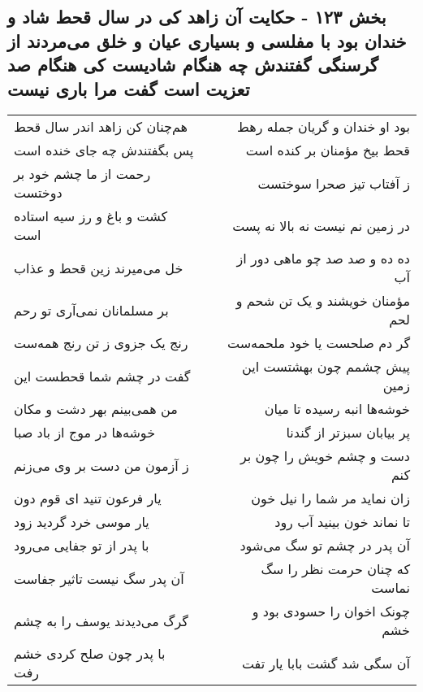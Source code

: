 \begin{center}
\section*{بخش ۱۲۳ - حکایت آن زاهد کی در سال قحط شاد و خندان بود با مفلسی و بسیاری عیان و خلق می‌مردند از گرسنگی گفتندش چه هنگام  شادیست کی هنگام صد تعزیت است گفت مرا باری نیست}
\label{sec:sh123}
\begin{longtable}{l p{0.5cm} r}
هم‌چنان کن زاهد اندر سال قحط
&&
بود او خندان و گریان جمله رهط
\\
پس بگفتندش چه جای خنده است
&&
قحط بیخ مؤمنان بر کنده است
\\
رحمت از ما چشم خود بر دوختست
&&
ز آفتاب تیز صحرا سوختست
\\
کشت و باغ و رز سیه استاده است
&&
در زمین نم نیست نه بالا نه پست
\\
خل می‌میرند زین قحط و عذاب
&&
ده ده و صد صد چو ماهی دور از آب
\\
بر مسلمانان نمی‌آری تو رحم
&&
مؤمنان خویشند و یک تن شحم و لحم
\\
رنج یک جزوی ز تن رنج همه‌ست
&&
گر دم صلحست یا خود ملحمه‌ست
\\
گفت در چشم شما قحطست این
&&
پیش چشمم چون بهشتست این زمین
\\
من همی‌بینم بهر دشت و مکان
&&
خوشه‌ها انبه رسیده تا میان
\\
خوشه‌ها در موج از باد صبا
&&
پر بیابان سبزتر از گندنا
\\
ز آزمون من دست بر وی می‌زنم
&&
دست و چشم خویش را چون بر کنم
\\
یار فرعون تنید ای قوم دون
&&
زان نماید مر شما را نیل خون
\\
یار موسی خرد گردید زود
&&
تا نماند خون بینید آب رود
\\
با پدر از تو جفایی می‌رود
&&
آن پدر در چشم تو سگ می‌شود
\\
آن پدر سگ نیست تاثیر جفاست
&&
که چنان حرمت نظر را سگ نماست
\\
گرگ می‌دیدند یوسف را به چشم
&&
چونک اخوان را حسودی بود و خشم
\\
با پدر چون صلح کردی خشم رفت
&&
آن سگی شد گشت بابا یار تفت
\\
\end{longtable}
\end{center}
